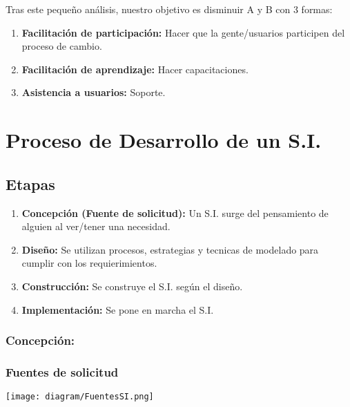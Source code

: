 \documentclass{templateNote}
\begin{document}
Tras este peque\~no an\'alisis, nuestro objetivo es disminuir A y B con 3 formas:
\begin{enumerate}
    \item \textbf{Facilitaci\'on de participaci\'on:} Hacer que la gente/usuarios participen del proceso de cambio.
    \item \textbf{Facilitaci\'on de aprendizaje:} Hacer capacitaciones.
    \item \textbf{Asistencia a usuarios:} Soporte.
\end{enumerate}

\newpage
\section{Proceso de Desarrollo de un S.I.}
\subsection{Etapas}
\begin{enumerate}
    \item \textbf{Concepci\'on (Fuente de solicitud):} Un S.I. surge del pensamiento de alguien al ver/tener una necesidad.
    \item \textbf{Dise\~no:} Se utilizan procesos, estrategias y tecnicas de modelado para cumplir con los requierimientos.
    \item \textbf{Construcci\'on:} Se construye el S.I. seg\'un el dise\~no.
    \item \textbf{Implementaci\'on:} Se pone en marcha el S.I.
\end{enumerate}

\subsubsection{Concepci\'on:}
\subsubsection*{Fuentes de solicitud}
\begin{center}
    \texttt{[image: diagram/FuentesSI.png]}
\end{center}
\end{document}
